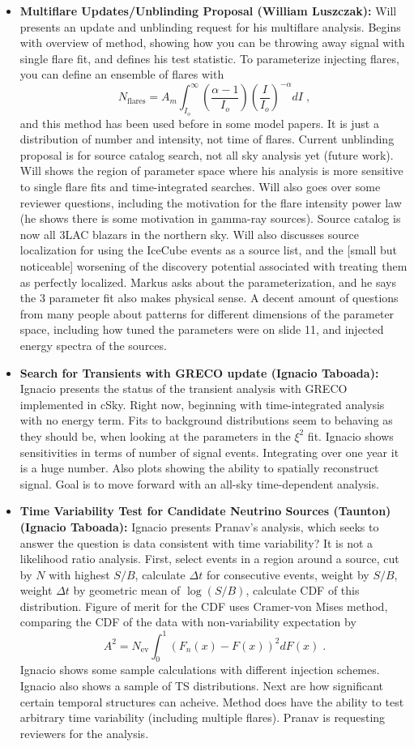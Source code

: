 \begin{itemize}
    \item \textbf{Multiflare Updates/Unblinding Proposal (William Luszczak):} Will presents an update and unblinding request for his multiflare analysis. Begins with overview of method, showing how you can be throwing away signal with single flare fit, and defines his test statistic. To parameterize injecting flares, you can define an ensemble of flares with $$ N_{\text {flares}}=A_{m} \int_{I_{o}}^{\infty}\left(\frac{\alpha-1}{I_{o}}\right)\left(\frac{I}{I_{o}}\right)^{-\alpha} d I \;,$$ and this method has been used before in some model papers. It is just a distribution of number and intensity, not time of flares. Current unblinding proposal is for source catalog search, not all sky analysis yet (future work). Will shows the region of parameter space where his analysis is more sensitive to single flare fits and time-integrated searches. Will also goes over some reviewer questions, including the motivation for the flare intensity power law (he shows there is some motivation in gamma-ray sources). Source catalog is now all 3LAC blazars in the northern sky. Will also discusses source localization for using the IceCube events as a source list, and the [small but noticeable] worsening of the discovery potential associated with treating them as perfectly localized. Markus asks about the parameterization, and he says the 3 parameter fit also makes physical sense. A decent amount of questions from many people about patterns for different dimensions of the parameter space, including how tuned the parameters were on slide 11, and injected energy spectra of the sources.  
    \item \textbf{Search for Transients with GRECO update (Ignacio Taboada):} Ignacio presents the status of the transient analysis with GRECO implemented in cSky. Right now, beginning with time-integrated analysis with no energy term. Fits to background distributions seem to behaving as they should be, when looking at the parameters in the $\xi^2$ fit. Ignacio shows sensitivities in terms of number of signal events. Integrating over one year it is a huge number. Also plots showing the ability to spatially reconstruct signal. Goal is to move forward with an all-sky time-dependent analysis. 
    \item \textbf{Time Variability Test for Candidate Neutrino Sources (Taunton) (Ignacio Taboada):} Ignacio presents Pranav's analysis, which seeks to answer the question is data consistent with time variability? It is not a likelihood ratio analysis. First, select events in a region around a source, cut by $N$ with highest $S/B$, calculate $\Delta t$ for consecutive events, weight by $S/B$, weight $\Delta t$ by geometric mean of $\log(S/B)$, calculate CDF of this distribution. Figure of merit for the CDF uses Cramer-von Mises method, comparing the CDF of the data with non-variability expectation by $$A^{2}=N_{\mathrm{ev}} \int_{0}^{1}\left(F_{n}(x)-F(x)\right)^{2} d F(x) \; .$$ Ignacio shows some sample calculations with different injection schemes. Ignacio also shows a sample of TS distributions. Next are how significant certain temporal structures can acheive. Method does have the ability to test arbitrary time variability (including multiple flares). Pranav is requesting reviewers for the analysis. 

\end{itemize}
